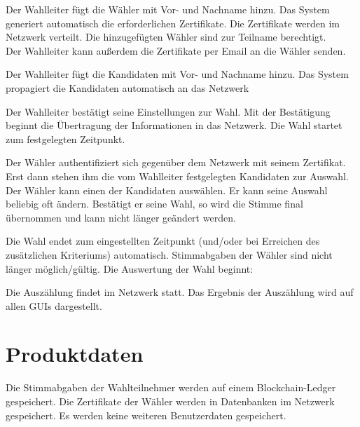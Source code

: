 \documentclass[parskip=full,11pt,twoside]{scrartcl}
\begin{document}
Der Wahlleiter fügt die Wähler mit Vor- und Nachname hinzu. Das System generiert automatisch die erforderlichen Zertifikate. Die Zertifikate werden im Netzwerk verteilt. Die hinzugefügten Wähler sind zur Teilname berechtigt. \\
Der Wahlleiter kann außerdem die Zertifikate per Email an die Wähler senden. %

Der Wahlleiter fügt die Kandidaten mit Vor- und Nachname hinzu. Das System propagiert die Kandidaten automatisch an das Netzwerk

Der Wahlleiter bestätigt seine Einstellungen zur Wahl. Mit der Bestätigung beginnt die Übertragung der Informationen in das Netzwerk. Die Wahl startet zum festgelegten Zeitpunkt.

Der Wähler authentifiziert sich gegenüber dem Netzwerk mit seinem Zertifikat.
Erst dann stehen ihm die vom Wahlleiter festgelegten Kandidaten zur Auswahl.
Der Wähler kann einen der Kandidaten auswählen.
Er kann seine Auswahl beliebig oft ändern.
Bestätigt er seine Wahl, so wird die Stimme final übernommen und kann nicht länger geändert werden.

Die Wahl endet zum eingestellten Zeitpunkt (und/oder bei Erreichen des zusätzlichen Kriteriums) automatisch. Stimmabgaben der Wähler sind nicht länger möglich/gültig. Die Auswertung der Wahl beginnt:

Die Auszählung findet im Netzwerk statt. Das Ergebnis der Auszählung wird auf allen GUIs dargestellt.

\section{Produktdaten}

Die Stimmabgaben der Wahlteilnehmer werden auf einem Blockchain-Ledger gespeichert.
Die Zertifikate der Wähler werden in Datenbanken im Netzwerk gespeichert.
Es werden keine weiteren Benutzerdaten gespeichert.
\end{document}
